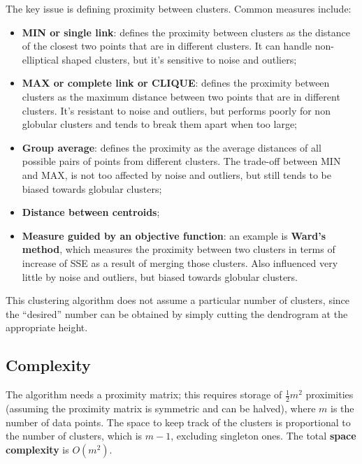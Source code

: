 The key issue is defining proximity between clusters. Common measures include:

\begin{itemize}
    \item \textbf{MIN or single link}: defines the proximity between clusters as the distance of the closest two points that are in different clusters. It can handle non-elliptical shaped clusters, but it's sensitive to noise and outliers;

    \item \textbf{MAX or complete link or CLIQUE}: defines the proximity between clusters as the maximum distance between two points that are in different clusters. It's resistant to noise and outliers, but performs poorly for non globular clusters and tends to break them apart when too large;

    \item \textbf{Group average}: defines the proximity as the average distances of all possible pairs of points from different clusters. The trade-off between MIN and MAX, is not too affected by noise and outliers, but still tends to be biased towards globular clusters;

    \item \textbf{Distance between centroids};

    \item \textbf{Measure guided by an objective function}: an example is \textbf{Ward's method}, which measures the proximity between two clusters in terms of increase of SSE as a result of merging those clusters. Also influenced very little by noise and outliers, but biased towards globular clusters.
\end{itemize}

This clustering algorithm does not assume a particular number of clusters, since the ``desired'' number can be obtained by simply cutting the dendrogram at the appropriate height. 

\subsection{Complexity}

The algorithm needs a proximity matrix; this requires storage of $\frac{1}{2} m^2$ proximities (assuming the proximity matrix is symmetric and can be halved), where $m$ is the number of data points. The space to keep track of the clusters is proportional to the number of clusters, which is $m-1$, excluding singleton ones. The total \textbf{space complexity} is $O(m^2)$.

